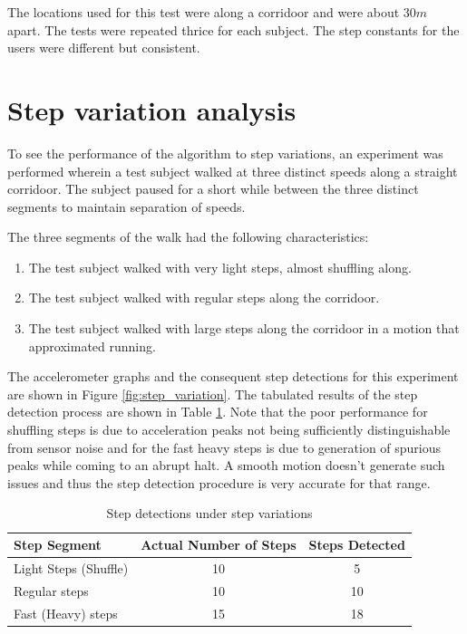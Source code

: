 The locations used for this test were along a corridoor and were about $30 m$
apart. The tests were repeated thrice for each subject. The step constants
for the users were different but consistent.

\section{Step variation analysis}

To see the performance of the algorithm to step variations, an experiment 
was performed wherein a test subject walked at three distinct speeds
along a straight corridoor. The subject paused for a short while between 
the three distinct segments to maintain separation of speeds.

The three segments of the walk had the following
characteristics:

\begin{enumerate}
\item The test subject walked with very light steps, almost shuffling along. 
\item The test subject walked with regular steps along the corridoor.
\item The test subject walked with large steps along the corridoor in a motion
    that approximated running.
\end{enumerate}

The accelerometer graphs and the consequent step detections for this 
experiment are shown in Figure \ref{fig:step_variation}. The tabulated
results of the step detection process are shown in 
Table \ref{tbl:step_variation}. Note that the poor performance for 
shuffling steps is due to acceleration peaks not being sufficiently 
distinguishable from sensor noise and for the fast heavy steps is 
due to generation of spurious peaks while coming to an abrupt halt.
A smooth motion doesn't generate such issues and thus the step 
detection procedure is very accurate for that range.

\begin{table}[tbph]
    \centering
    \begin{tabular}{|l|c|c|}
        \hline
        \hline
        Step Segment & Actual Number of Steps & Steps Detected \\
        \hline
        Light Steps (Shuffle) & 10 & 5 \\
        Regular steps & 10 & 10 \\
        Fast (Heavy) steps & 15 & 18 \\
        \hline
        \hline
    \end{tabular}
    \caption{Step detections under step variations\label{tbl:step_variation}}
\end{table}

